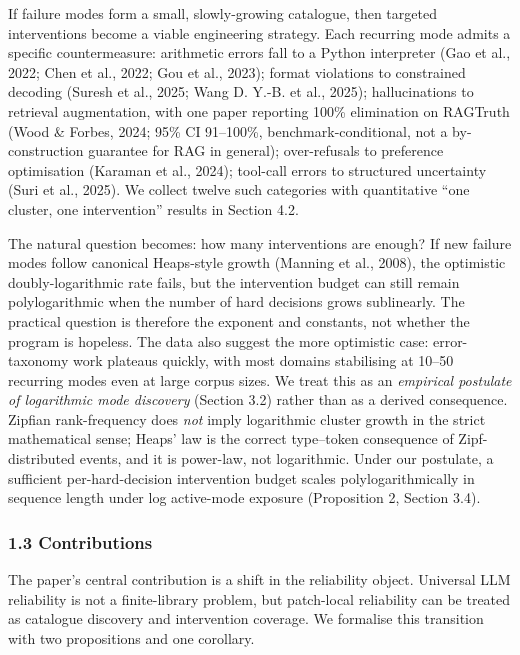 \documentclass[
]{article}
\begin{document}
If failure modes form a small, slowly-growing catalogue, then targeted
interventions become a viable engineering strategy. Each recurring mode
admits a specific countermeasure: arithmetic errors fall to a Python
interpreter (Gao et al., 2022; Chen et al., 2022; Gou et al., 2023);
format violations to constrained decoding (Suresh et al., 2025; Wang D.
Y.-B. et al., 2025); hallucinations to retrieval augmentation, with one
paper reporting 100\% elimination on RAGTruth (Wood \& Forbes, 2024;
95\% CI 91--100\%, benchmark-conditional, not a by-construction
guarantee for RAG in general); over-refusals to preference optimisation
(Karaman et al., 2024); tool-call errors to structured uncertainty (Suri
et al., 2025). We collect twelve such categories with quantitative ``one
cluster, one intervention'' results in Section 4.2.

The natural question becomes: how many interventions are enough? If new
failure modes follow canonical Heaps-style growth (Manning et al.,
2008), the optimistic doubly-logarithmic rate fails, but the
intervention budget can still remain polylogarithmic when the number of
hard decisions grows sublinearly. The practical question is therefore
the exponent and constants, not whether the program is hopeless. The
data also suggest the more optimistic case: error-taxonomy work plateaus
quickly, with most domains stabilising at 10--50 recurring modes even at
large corpus sizes. We treat this as an \emph{empirical postulate of
logarithmic mode discovery} (Section 3.2) rather than as a derived
consequence. Zipfian rank-frequency does \emph{not} imply logarithmic
cluster growth in the strict mathematical sense; Heaps' law is the
correct type--token consequence of Zipf-distributed events, and it is
power-law, not logarithmic. Under our postulate, a sufficient
per-hard-decision intervention budget scales polylogarithmically in
sequence length under log active-mode exposure (Proposition 2, Section
3.4).

\subsubsection{1.3 Contributions}\label{contributions}

The paper's central contribution is a shift in the reliability object.
Universal LLM reliability is not a finite-library problem, but
patch-local reliability can be treated as catalogue discovery and
intervention coverage. We formalise this transition with two
propositions and one corollary.
\end{document}

